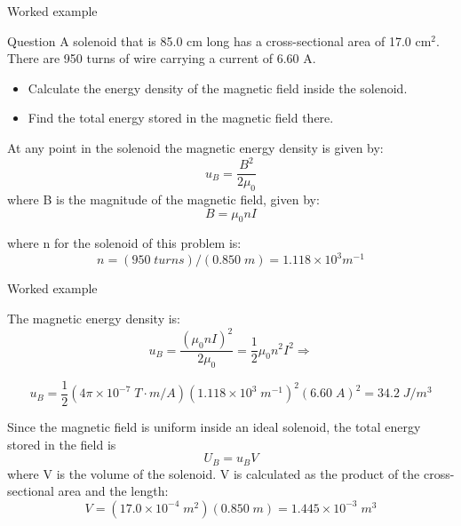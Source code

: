 
%
%

{
\problemslide

\begin{frame}{Worked example}

\begin{blockexmplque}{Question}
  A solenoid that is 85.0 cm long has a cross-sectional area of 17.0
  cm$^2$. There are 950 turns of wire carrying a current of 6.60 A.\\
  \begin{itemize}
     \item Calculate the energy density of the magnetic field inside the
       solenoid.
     \item Find the total energy stored in the magnetic field there.
  \end{itemize}
\end{blockexmplque}

At any point in the solenoid the magnetic energy density is given by:
\begin{equation*}
  u_B = \frac{B^2}{2\mu_0}
\end{equation*}
where B is the magnitude of the magnetic field, given by:
\begin{equation*}
  B = \mu_0 n I
\end{equation*}

where n for the solenoid of this problem is:
\begin{equation*}
    n = (950 \; turns)/(0.850 \; m) = 1.118 \times 10^{3} m^{-1}
\end{equation*}

\end{frame}

%
%
%
%

\begin{frame}{Worked example}

The magnetic energy density is:
\begin{equation*}
    u_B = \frac{(\mu_0 n I)^2}{2\mu_0} = \frac{1}{2} \mu_0 n^2 I^2 \Rightarrow
\end{equation*}

\begin{equation*}
    u_B = \frac{1}{2} (4\pi \times 10^{-7} \; T \cdot m/A)(1.118 \times
    10^3 \; m^{-1})^2 (6.60\; A)^2 = 34.2 \; J/m^3
\end{equation*}

Since the magnetic field is uniform inside an ideal solenoid, the
total energy stored in the field is
\begin{equation*}
  U_B = u_B V
\end{equation*}
where V is the volume of the solenoid.
V is calculated as the product of the cross-sectional area and the
length:
\begin{equation*}
  V = (17.0 \times 10^{-4} \; m^2)(0.850 \; m) = 1.445 \times 10^{-3} \; m^3
\end{equation*}


\end{frame}}
